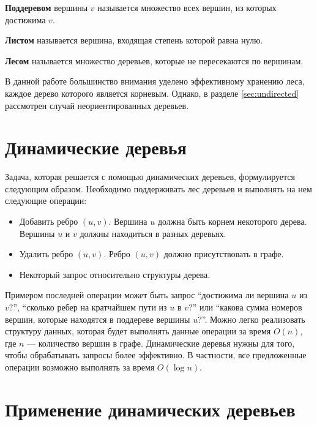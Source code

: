 {\bf Поддеревом} вершины $v$ называется множество всех вершин, из которых достижима $v$.

{\bf Листом} называется вершина, входящая степень которой равна нулю.

{\bf Лесом} называется множество деревьев, которые не пересекаются по вершинам.

В данной работе большинство внимания уделено эффективному хранению леса, каждое дерево которого является корневым. 
Однако, в разделе \ref{sec:undirected} рассмотрен случай неориентированных деревьев.

\FloatBarrier

\section{Динамические деревья}

Задача, которая решается с помощью динамических деревьев, формулируется следующим образом. Необходимо поддерживать лес деревьев и выполнять на нем следующие операции:
\begin{itemize}
\item Добавить ребро $(u, v)$. Вершина $u$ должна быть корнем некоторого дерева. Вершины $u$ и $v$ должны находиться в разных деревьях.
\item Удалить ребро $(u, v)$. Ребро $(u, v)$ должно присутствовать в графе.
\item Некоторый запрос относительно структуры дерева.
\end{itemize}

Примером последней операции может быть запрос ``достижима ли вершина $u$ из $v$?'', 
``сколько ребер на кратчайшем пути из $u$ в $v$?'' или ``какова сумма номеров вершин, которые находятся в поддереве вершины $u$?''.
Можно легко реализовать структуру данных, которая будет выполнять данные
 операции за время $O(n)$, где $n$ --- количество вершин в графе. 
Динамические деревья нужны для того, чтобы обрабатывать запросы более эффективно. 
В частности, все предложенные операции возможно выполнять за время $O(\log n)$.
  
\FloatBarrier

\section{Применение динамических деревьев}

